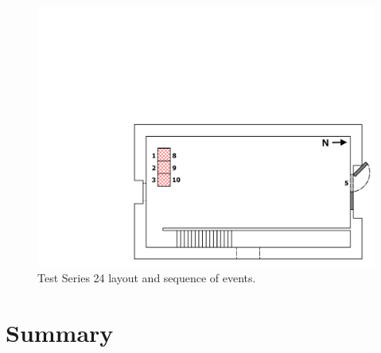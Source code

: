 \documentclass[12pt,oneside]{book}
\begin{document}
\begin{figure}[!ht]
\begin{minipage}[b]{0.9\columnwidth}
	\includegraphics[width=\columnwidth]{../Figures/Floor_Plans/West_Structure_1st_Floor_Test_24}
\end{minipage}
\caption{Test Series 24 layout and sequence of events.}
\label{fig:west_test_24}
\end{figure}
\FloatBarrier

\clearpage

\chapter{Summary}
\label{chap:Summary}



\appendix
\end{document}
